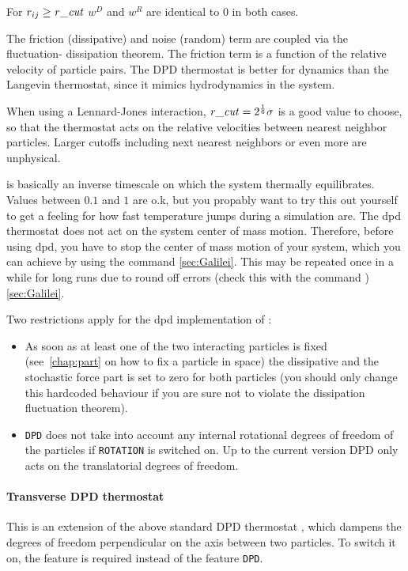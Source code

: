 For $ r_{ij} \ge \mathrm{\mathit{r\_cut}} $  $w^D$ and $w^R$ are identical to 0 in both cases.

The friction (dissipative) and noise (random) term are coupled via the
fluctuation- dissipation theorem. The friction term is a function of
the relative velocity of particle pairs.  The DPD thermostat is better
for dynamics than the Langevin thermostat, since it mimics
hydrodynamics in the system.

When using a Lennard-Jones interaction, $\mathrm{\mathit{r\_cut}} =
2^{\frac{1}{6}} \sigma$ is a good value to choose, so that the
thermostat acts on the relative velocities between nearest neighbor
particles.  Larger cutoffs including next nearest neighbors or even
more are unphysical.

 is basically an inverse timescale on which the system
thermally equilibrates.  Values between $0.1$ and $1$ are o.k, but you
propably want to try this out yourself to get a feeling for how fast
temperature jumps during a simulation are. The dpd thermostat does not
act on the system center of mass motion.  Therefore, before using dpd,
you have to stop the center of mass motion of your system, which you
can achieve by using the command  
\ref{sec:Galilei}. This may be repeated once in a while for long 
runs due to round off errors (check this with the command 
) \ref{sec:Galilei}.

Two restrictions apply for the dpd implementation of \es:

\begin{itemize}
\item As soon as at least one of the two interacting particles is
  fixed (see~\ref{chap:part} on how to fix a particle in space) the
  dissipative and the stochastic force part is set to zero for both
  particles (you should only change this hardcoded behaviour if you
  are sure not to violate the dissipation fluctuation theorem).
\item \texttt{DPD} does not take into account any internal rotational
  degrees of freedom of the particles if \texttt{ROTATION} is switched
  on. Up to the current version DPD only acts on the translatorial
  degrees of freedom.
\end{itemize}

\paragraph{Transverse DPD thermostat}\label{sec:transDPD}
This is an extension of the above standard DPD thermostat
\cite{junghans2008}, which dampens the degrees of freedom
perpendicular on the axis between two particles. To switch it on, the
feature  is required instead of the feature
\texttt{DPD}.

